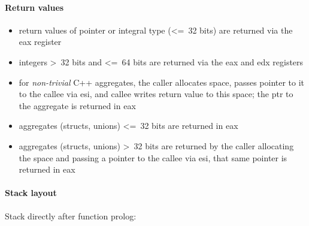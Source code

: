 \paragraph{Return values}

\begin{itemize}
\item return values of pointer or integral type (\textless=\ 32 bits) are returned via the eax register
\item integers \textgreater\ 32 bits and \textless=\ 64 bits are returned via the eax and edx registers
\item for {\it non-trivial} C++ aggregates, the caller allocates space, passes pointer to it to the callee via esi, and callee writes return value to
this space; the ptr to the aggregate is returned in eax
\item aggregates (structs, unions) \textless=\ 32 bits are returned in eax
\item aggregates (structs, unions) \textgreater\ 32 bits are returned by the caller allocating the space and
passing a pointer to the callee via esi, that same pointer is returned in eax
\end{itemize}


\paragraph{Stack layout}

Stack directly after function prolog:\\

